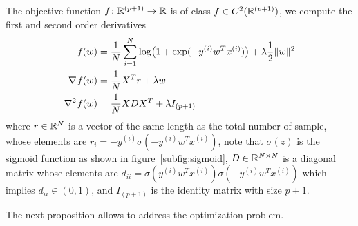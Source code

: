 The objective function $f\colon\mathbb{R}^{(p+1)}\to\mathbb{R}$ is of class $f\in C^2(\mathbb{R}^{(p+1)})$, we compute the first and second order derivatives
\begin{subequations}\label{eq:f-df-ddf}
\begin{align}
\operatorname*{\mathit{f}}(w) &= \frac{1}{N}\sum_{i=1}^N\log\bigl(1+\exp(-y^{(i)}w^Tx^{(i)})\bigr)+\lambda\frac{1}{2}\lVert w\rVert^2 \label{subeq:obj-fun} \\
\nabla\operatorname*{\mathit{f}}(w) &= \frac{1}{N}X^Tr+\lambda w \label{subeq:jacobian} \\
\nabla^2\operatorname*{\mathit{f}}(w) &= \frac{1}{N}XDX^T+\lambda I_{(p+1)}\label{subeq:hessian}
\end{align}
\end{subequations}
where $r\in\mathbb{R}^N$ is a vector of the same length as the total number of sample, whose elements are $r_i=-y^{(i)}\sigma(-y^{(i)}w^Tx^{(i)})$, note that $\sigma(z)$ is the sigmoid function as shown in figure~\vref{subfig:sigmoid}, $D\in\mathbb{R}^{N\times N}$ is a diagonal matrix whose elements are $d_{ii}=\sigma(y^{(i)}w^Tx^{(i)})\sigma(-y^{(i)}w^Tx^{(i)})$ which implies $d_{ii}\in(0,1)$, and $I_{(p+1)}$ is the identity matrix with size $p+1$.




The next proposition allows to address the optimization problem.

